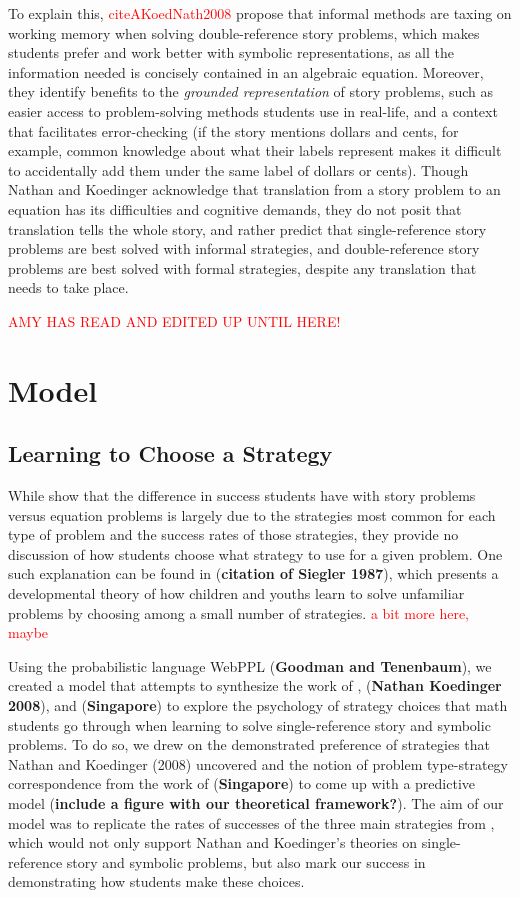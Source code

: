 \documentclass[10pt,letterpaper]{article}
\newcommand\TODO[1]{\textcolor{red}{#1}}
\begin{document}
To explain this, \TODO{citeAKoedNath2008} propose that informal methods are taxing on working memory when solving double-reference story problems, which makes students prefer and work better with symbolic representations, as all the information needed is concisely contained in an algebraic equation. Moreover, they identify benefits to the \textit{grounded representation} of story problems, such as easier access to problem-solving methods students use in real-life, and a context that facilitates error-checking (if the story mentions dollars and cents, for example, common knowledge about what their labels represent makes it difficult to accidentally add them under the same label of dollars or cents). Though Nathan and Koedinger acknowledge that translation from a story problem to an equation has its difficulties and cognitive demands, they do not posit that translation tells the whole story, and rather predict that single-reference story problems are best solved with informal strategies, and double-reference story problems are best solved with formal strategies, despite any translation that needs to take place.


\TODO{AMY HAS READ AND EDITED UP UNTIL HERE!}


\section{Model}


\subsection{Learning to Choose a Strategy}
While  show that the difference in success students have with story problems versus equation problems is largely due to the strategies most common for each type of problem and the success rates of those strategies, they provide no discussion of how students choose what strategy to use for a given problem. One such explanation can be found in (\textbf{citation of Siegler 1987}), which presents a developmental theory of how children and youths learn to solve unfamiliar problems by choosing among a small number of strategies. \TODO{a bit more here, maybe}


Using the probabilistic language WebPPL (\textbf{Goodman and Tenenbaum}), we created a model that attempts to synthesize the work of , (\textbf{Nathan Koedinger 2008}), and (\textbf{Singapore}) to explore the psychology of strategy choices that math students go through when learning to solve single-reference story and symbolic problems. To do so, we drew on the demonstrated preference of strategies that Nathan and Koedinger (2008) uncovered and the notion of problem type-strategy correspondence from the work of (\textbf{Singapore}) to come up with a predictive model (\textbf{include a figure with our theoretical framework?}). The aim of our model was to replicate the rates of successes of the three main strategies from , which would not only support Nathan and Koedinger's theories on single-reference story and symbolic problems, but also mark our success in demonstrating how students make these choices.
\end{document}
